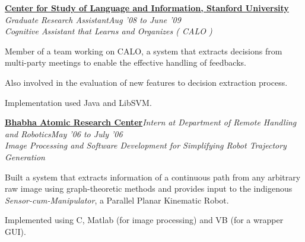 \documentclass[10pt]{article}
\newcommand{\blankline}{\vspace{0.12cm}}
\newcommand{\spc}{\vspace{2mm}}
\begin{document}
\blankline

\href{http://www-csli.stanford.edu/}{\textbf{Center for Study of Language and Information, Stanford University}}\\
\textit{Graduate Research Assistant}\hfill \textit{Aug '08 to June '09}\\
 \emph{Cognitive Assistant that Learns and  Organizes ( CALO )}
       \begin{compactitem}
        \item Member of a team working on CALO, a system that extracts decisions from multi-party meetings to enable the effective handling of feedbacks.
        \item Also involved in the evaluation of new features to decision extraction process. 
        \item Implementation used Java and LibSVM.
       \end{compactitem}

\blankline
\spc
\href{http://www.barc.ernet.in/}{\textbf{Bhabha Atomic Research Center}}\hspace{0.2cm}\textit{Intern at Department of Remote Handling and Robotics}\hfill \textit{May '06 to July '06}\\
 \emph{Image Processing and Software Development for Simplifying Robot Trajectory Generation}
       \begin{compactitem}
        \item {Built a system  that extracts information of a continuous path from any arbitrary raw image using  graph-theoretic methods and provides input to the indigenous \emph{Sensor-cum-Manipulator}, a Parallel Planar Kinematic Robot.}
          \item {Implemented using C, Matlab (for image processing) and VB (for a wrapper GUI).}
        \end{compactitem}

\end{document}
